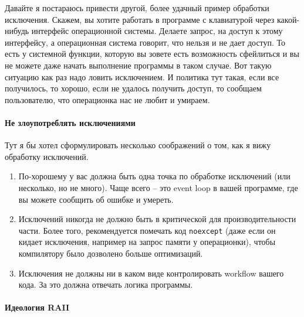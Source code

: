 \documentclass{article}
\begin{document}
Давайте я постараюсь привести другой, более удачный пример обработки исключения. Скажем, вы хотите работать в программе с клавиатурой через какой-нибудь интерфейс операционной системы. Делаете запрос, на доступ к этому интерфейсу, а операционная система говорит, что нельзя и не дает доступ. То есть у системной функции, которую вы зовете есть возможность сфейлиться и вы не можете даже начать выполнение программы в таком случае. Вот такую ситуацию как раз надо ловить исключением. И политика тут такая, если все получилось, то хорошо, если не удалось получить доступ, то сообщаем пользователю, что операционка нас не любит и умираем.

\paragraph{Не злоупотреблять исключениями}

Тут я бы хотел сформулировать несколько соображений о том, как я вижу обработку исключений.
\begin{enumerate}
\item По-хорошему у вас должна быть одна точка по обработке исключений (или несколько, но не много). Чаще всего -- это event loop в вашей программе, где вы можете сообщить об ошибке и умереть.

\item Исключений никогда не должно быть в критической для производительности части. Более того, рекомендуется помечать код \verb"noexcept" (даже если он кидает исключения, например на запрос памяти у операционки), чтобы компилятору было дозволено больше оптимизаций.

\item Исключения не должны ни в каком виде контролировать workflow вашего кода. За это должна отвечать логика программы. 
\end{enumerate}

\paragraph{Идеология RAII}
\end{document}
